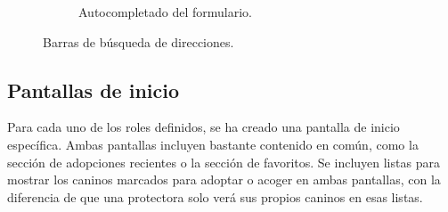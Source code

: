 \documentclass[a4paper, 12pt]{article}
\begin{document}
\begin{figure}[H]
\begin{subfigure}{0.48\textwidth}
\begin{center}
			\caption{Autocompletado del formulario.}
		\end{center}  
	\end{subfigure}\hfill
	\caption{Barras de búsqueda de direcciones.}
\end{figure}


\newpage
\subsection*{Pantallas de inicio}

Para cada uno de los roles definidos, se ha creado una pantalla de inicio específica. Ambas pantallas incluyen bastante contenido en común, como la sección de adopciones recientes o la sección de favoritos. Se incluyen listas para mostrar los caninos marcados para adoptar o acoger en ambas pantallas, con la diferencia de que una protectora solo verá sus propios caninos en esas listas. 
\end{document}
